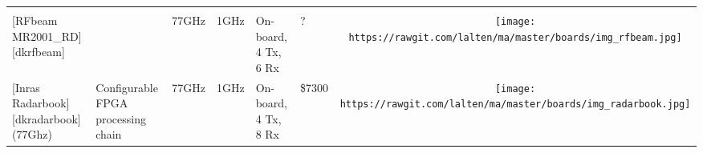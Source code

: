 \begin{longtable}[]{@{}llllllc@{}}
\begin{minipage}[t]{0.10\columnwidth}
\end{minipage}\tabularnewline
\begin{minipage}[t]{0.09\columnwidth}\raggedright\strut
{[}RFbeam MR2001\_RD{]}{[}dkrfbeam{]}\strut
\end{minipage} & \begin{minipage}[t]{0.13\columnwidth}\raggedright\strut
\strut
\end{minipage} & \begin{minipage}[t]{0.09\columnwidth}\raggedright\strut
77GHz\strut
\end{minipage} & \begin{minipage}[t]{0.11\columnwidth}\raggedright\strut
1GHz\strut
\end{minipage} & \begin{minipage}[t]{0.10\columnwidth}\raggedright\strut
On-board, 4 Tx, 6 Rx\strut
\end{minipage} & \begin{minipage}[t]{0.15\columnwidth}\raggedright\strut
?\strut
\end{minipage} & \begin{minipage}[t]{0.10\columnwidth}\centering\strut
\texttt{[image: https://rawgit.com/lalten/ma/master/boards/img\_rfbeam.jpg]}\strut
\end{minipage}\tabularnewline
\begin{minipage}[t]{0.09\columnwidth}\raggedright\strut
{[}Inras Radarbook{]}{[}dkradarbook{]} (77Ghz)\strut
\end{minipage} & \begin{minipage}[t]{0.13\columnwidth}\raggedright\strut
Configurable FPGA processing chain\strut
\end{minipage} & \begin{minipage}[t]{0.09\columnwidth}\raggedright\strut
77GHz\strut
\end{minipage} & \begin{minipage}[t]{0.11\columnwidth}\raggedright\strut
1GHz\strut
\end{minipage} & \begin{minipage}[t]{0.10\columnwidth}\raggedright\strut
On-board, 4 Tx, 8 Rx\strut
\end{minipage} & \begin{minipage}[t]{0.15\columnwidth}\raggedright\strut
\$7300\strut
\end{minipage} & \begin{minipage}[t]{0.10\columnwidth}\centering\strut
\texttt{[image: https://rawgit.com/lalten/ma/master/boards/img\_radarbook.jpg]}\strut

\end{minipage}
\end{longtable}
